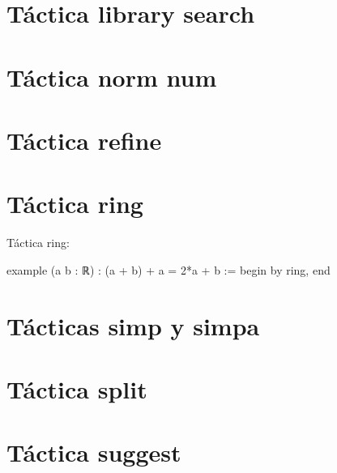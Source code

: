 \section{Táctica library search}

\section{Táctica norm num}

\section{Táctica refine}

\section{Táctica ring}

Táctica ring:
\begin{leancode}
example (a b : ℝ) : (a + b) + a = 2*a + b :=
begin
  by ring,
end
\end{leancode}

\section{Tácticas simp y simpa}

\section{Táctica split}

\section{Táctica suggest}

